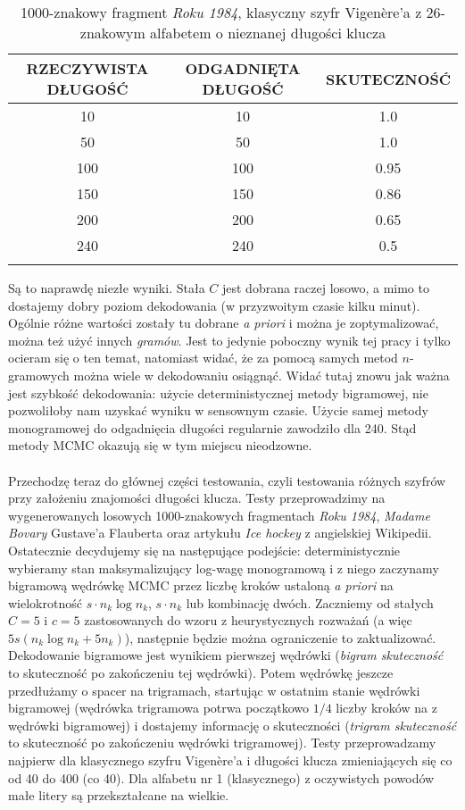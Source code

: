 \documentclass[a4paper]{article}
\theoremstyle{defn}
\theoremstyle{theorem}
\theoremstyle{lemma}
\theoremstyle{cor}
\theoremstyle{fact}
\begin{document}
\begin{center}\begin{longtable}{|c|c|c|}
\hline RZECZYWISTA DŁUGOŚĆ & ODGADNIĘTA DŁUGOŚĆ & SKUTECZNOŚĆ\\ \hline 
10 & 10 & 1.0\\ \hline 
50 & 50 & 1.0\\ \hline 
100 & 100 & 0.95\\ \hline 
150 & 150 & 0.86\\ \hline 
200 & 200 & 0.65\\ \hline 
240 & 240 & 0.5\\ \hline 
\caption{1000-znakowy fragment \textit{Roku 1984}, klasyczny szyfr Vigenère'a z 26-znakowym alfabetem o nieznanej długości klucza}
\end{longtable}\end{center} 
Są to naprawdę niezłe wyniki. Stała $C$ jest dobrana raczej losowo, a mimo to dostajemy dobry poziom dekodowania (w przyzwoitym czasie kilku minut). Ogólnie różne wartości zostały tu dobrane \textit{a priori} i można je zoptymalizować, można też użyć innych \textit{gramów}. Jest to jedynie poboczny wynik tej pracy i tylko ocieram się o ten temat, natomiast widać, że za pomocą samych metod $n$-gramowych można wiele w dekodowaniu osiągnąć. Widać tutaj znowu jak ważna jest szybkość dekodowania: użycie deterministycznej metody bigramowej, nie pozwoliłoby nam uzyskać wyniku w sensownym czasie. Użycie samej metody monogramowej do odgadnięcia długości regularnie zawodziło dla 240. Stąd metody MCMC okazują się w tym miejscu nieodzowne.
\\\\
Przechodzę teraz do głównej części testowania, czyli testowania różnych szyfrów przy założeniu znajomości długości klucza.
 Testy przeprowadzimy na wygenerowanych losowych 1000-znakowych fragmentach \textit{Roku 1984}, \textit{Madame Bovary}  Gustave'a Flauberta \cite{gutenberg} oraz artykułu \textit{Ice hockey} \cite{hockey} z angielskiej Wikipedii. 
Ostatecznie decydujemy się na następujące podejście: deterministycznie wybieramy stan maksymalizujący log-wagę monogramową i z niego zaczynamy bigramową wędrówkę MCMC przez liczbę kroków ustaloną \textit{a priori} na wielokrotność $s \cdot n_k \log n_k$, $s \cdot n_k$ lub kombinację dwóch. Zaczniemy od stałych $C=5$  i $c=5$ zastosowanych do wzoru z heurystycznych rozważań (a więc $5s(n_k\log n_k + 5n_k)$), następnie będzie można ograniczenie to zaktualizować. Dekodowanie bigramowe jest wynikiem pierwszej wędrówki (\textit{bigram skuteczność} to skuteczność po zakończeniu tej wędrówki). Potem wędrówkę jeszcze przedłużamy o spacer na trigramach, startując w ostatnim stanie wędrówki bigramowej (wędrówka trigramowa potrwa początkowo $1/4$ liczby kroków na z wędrówki bigramowej) i dostajemy informację o skuteczności (\textit{trigram skuteczność} to skuteczność po zakończeniu wędrówki trigramowej). Testy przeprowadzamy najpierw dla klasycznego szyfru Vigenère'a i długości klucza zmieniających się co od 40 do 400 (co 40). Dla alfabetu nr 1 (klasycznego) z oczywistych powodów małe litery są przekształcane na wielkie.\\
\end{document}
